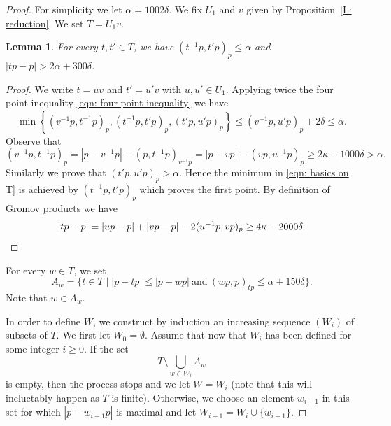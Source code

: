 \documentclass[JEP,XML,SOM,Unicode, NoEqCountersInSection,published]{cedram}
\theoremstyle{plain}
\newtheorem{lem}[thm]{Lemma}
\theoremstyle{definition}
\begin{document}
\begin{proof}
For simplicity we let $\alpha = 1002\delta$.
We fix $U_1$ and $v$ given by Proposition~\ref{L: reduction}.
We set $T=U_1v$.

\begin{lem}
\label{res: basics on T}
For every $t, t' \in T$, we have $(t^{-1}p,t'p)_p\leq \alpha$ and $|tp - p| > 2\alpha + 300\delta$.
\end{lem}

\begin{proof}
We write $t = uv$ and $t' = u'v$ with $u,u' \in U_1$.
Applying twice the four point inequality \eqref{eqn: four point inequality} we have
\begin{equation}
\label{eqn: basics on T}
\min\left\{ (v^{-1}p, t^{-1}p)_p, (t^{-1}p, t'p)_p, (t'p, u'p)_p \right\} \leq (v^{-1}p, u'p)_p + 2\delta \leq \alpha.
\end{equation}
Observe that
\begin{equation*}
(v^{-1}p, t^{-1}p)_p
= |p - v^{-1}p| - (p, t^{-1}p)_{v^{-1}p}
= |p - vp| - (vp, u^{-1}p)_p
\geq 2\kappa - 1000\delta > \alpha.
\end{equation*}
Similarly we prove that $(t'p, u'p)_p > \alpha$.
Hence the minimum in \eqref{eqn: basics on T} is achieved by $(t^{-1}p, t'p)_p$ which proves the first point.
By definition of Gromov products we have
\begin{equation*}
|tp - p| = |up - p| + |vp - p| - 2 (u^{-1}p,vp)_p
\geq 4\kappa - 2000\delta. \qedhere
\end{equation*}
\end{proof}

For every $w \in T$, we set
\begin{equation*}
A_w =\{ t \in T \mid |p - tp| \leq |p -wp|\ \text{and}\ (wp,p)_{tp} \leq \alpha + 150\delta\}.
\end{equation*}
Note that $w \in A_w$.

In order to define $W$, we construct by induction an increasing sequence $(W_i)$ of subsets of $T$.
We first let $W_0 = \emptyset$.
Assume that now that $W_i$ has been defined for some integer $i \geq 0$.
If the set
\begin{equation*}
T \setminus \bigcup_{w \in W_i} A_w
\end{equation*}
is empty, then the process stops and we let $W = W_i$ (note that this will ineluctably happen as $T$ is finite).
Otherwise, we choose an element $w_{i+1}$ in this set for which $|p - w_{i+1}p|$ is maximal and let $W_{i+1} = W_i \cup \{w_{i+1}\}$.


\end{proof}
\end{document}

